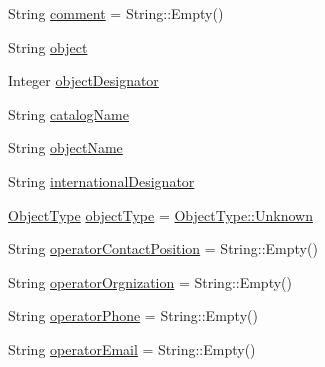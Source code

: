 \begin{DoxyCompactItemize}
\item 
String \hyperlink{structostk_1_1astro_1_1conjunction_1_1messages_1_1ccsds_1_1_c_d_m_1_1_metadata_a96b46dae4032dba90f24601425a8ace8}{comment} = String\+::\+Empty()
\item 
String \hyperlink{structostk_1_1astro_1_1conjunction_1_1messages_1_1ccsds_1_1_c_d_m_1_1_metadata_ace0fe39627c532a8b21a84c9c6886372}{object}
\item 
Integer \hyperlink{structostk_1_1astro_1_1conjunction_1_1messages_1_1ccsds_1_1_c_d_m_1_1_metadata_a135bbf761e45624d5cf29677756cce18}{object\+Designator}
\item 
String \hyperlink{structostk_1_1astro_1_1conjunction_1_1messages_1_1ccsds_1_1_c_d_m_1_1_metadata_a91b077a0f07ebf0c75816ad7f2fb4ba1}{catalog\+Name}
\item 
String \hyperlink{structostk_1_1astro_1_1conjunction_1_1messages_1_1ccsds_1_1_c_d_m_1_1_metadata_a842210f2ca1dacc597cfd570aa57c19d}{object\+Name}
\item 
String \hyperlink{structostk_1_1astro_1_1conjunction_1_1messages_1_1ccsds_1_1_c_d_m_1_1_metadata_ac11a59f1a624a5e7ada91a82b24bde2c}{international\+Designator}
\item 
\hyperlink{classostk_1_1astro_1_1conjunction_1_1messages_1_1ccsds_1_1_c_d_m_a9ef446f2327904fc0516249120ec9d71}{Object\+Type} \hyperlink{structostk_1_1astro_1_1conjunction_1_1messages_1_1ccsds_1_1_c_d_m_1_1_metadata_ace0a28e8456b7e950def75e9be2488da}{object\+Type} = \hyperlink{classostk_1_1astro_1_1conjunction_1_1messages_1_1ccsds_1_1_c_d_m_a9ef446f2327904fc0516249120ec9d71a88183b946cc5f0e8c96b2e66e1c74a7e}{Object\+Type\+::\+Unknown}
\item 
String \hyperlink{structostk_1_1astro_1_1conjunction_1_1messages_1_1ccsds_1_1_c_d_m_1_1_metadata_a6a891404a543cb582f1ea6289dc7bc59}{operator\+Contact\+Position} = String\+::\+Empty()
\item 
String \hyperlink{structostk_1_1astro_1_1conjunction_1_1messages_1_1ccsds_1_1_c_d_m_1_1_metadata_ada18b3efa3a6bb2df54ffc6f00cbbaaf}{operator\+Orgnization} = String\+::\+Empty()
\item 
String \hyperlink{structostk_1_1astro_1_1conjunction_1_1messages_1_1ccsds_1_1_c_d_m_1_1_metadata_a410654e822689ffb55db47df0ca8cbbf}{operator\+Phone} = String\+::\+Empty()
\item 
String \hyperlink{structostk_1_1astro_1_1conjunction_1_1messages_1_1ccsds_1_1_c_d_m_1_1_metadata_a0a577646ca9eb97424c29615f34ca477}{operator\+Email} = String\+::\+Empty()

\end{DoxyCompactItemize}
